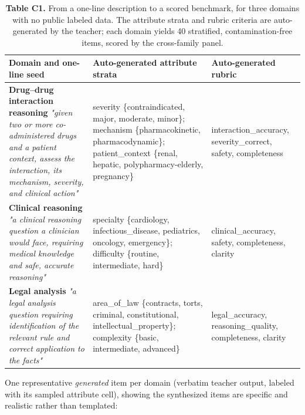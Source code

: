 \documentclass[11pt,a4paper]{article}
\begin{document}
\begin{table}[t]
\centering
\small\setlength{\tabcolsep}{4pt}%
\caption{\textbf{Table C1.} From a one-line description to a scored benchmark, for three domains with no
public labeled data. The attribute strata and rubric criteria are auto-generated by the teacher; each domain yields
40 stratified, contamination-free items, scored by the cross-family panel.}
\setlength{\tabcolsep}{4pt}
\begin{tabularx}{\textwidth}{>{\hsize=1.214\hsize\raggedright\arraybackslash}X >{\hsize=1.193\hsize\raggedright\arraybackslash}X >{\hsize=0.593\hsize\raggedright\arraybackslash}X}
\toprule
Domain and one-line seed & Auto-generated attribute strata & Auto-generated rubric \\
\midrule
\textbf{Drug--drug interaction reasoning}\newline 
\emph{"given two or more co-administered drugs and a patient context, assess the interaction, its mechanism, severity, and clinical action"} & severity \{contraindicated, major, moderate, minor\}; mechanism \{pharmacokinetic, pharmacodynamic\};
patient\_\allowbreak{}context \{renal, hepatic, polypharmacy-elderly, pregnancy\} & interaction\_\allowbreak{}accuracy, severity\_\allowbreak{}correct, safety, completeness \\
\textbf{Clinical reasoning}\newline 
\emph{"a clinical reasoning question a clinician would face, requiring medical knowledge and safe, accurate reasoning"} & specialty \{cardiology, infectious\_\allowbreak{}disease, pediatrics, oncology, emergency\}; difficulty \{routine, intermediate, hard\} & clinical\_\allowbreak{}accuracy, safety, completeness, clarity \\
\textbf{Legal analysis}\newline 
\emph{"a legal analysis question requiring identification of the relevant rule and correct application to the facts"} & area\_\allowbreak{}of\_\allowbreak{}law \{contracts, torts, criminal, constitutional, intellectual\_\allowbreak{}property\}; complexity \{basic, intermediate, advanced\} & legal\_\allowbreak{}accuracy, reasoning\_\allowbreak{}quality, completeness, clarity \\
\bottomrule
\end{tabularx}
\end{table}

One representative \emph{generated} item per domain (verbatim teacher output, labeled with its sampled attribute
cell), showing the synthesized items are specific and realistic rather than templated:
\end{document}
